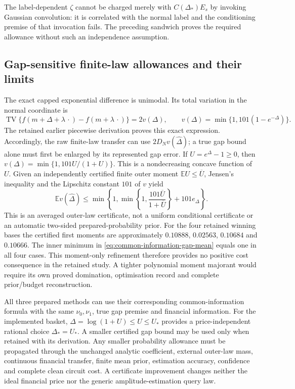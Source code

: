 The label-dependent $\zeta$ cannot be charged merely with
$C(\Delta_*)E_s$ by invoking Gaussian convolution: it is correlated with
the normal label and the conditioning premise of that invocation fails.
The preceding sandwich proves the required allowance without such an
independence assumption.

\subsection{Gap-sensitive finite-law allowances and their limits}

The exact capped exponential difference is unimodal. Its total variation
in the normal coordinate is
\begin{equation}
 \operatorname{TV}\{f(m+\Delta+\lambda\,\cdot)-f(m+\lambda\,\cdot)\}
 =2v(\Delta),\qquad
 v(\Delta)=\min\{1,101(1-e^{-\Delta})\}.
 \label{eq:common-information-gap-variation}
\end{equation}
The retained earlier piecewise derivation proves this exact expression.
Accordingly, the raw finite-law transfer can use
$2D_Nv(\widehat\Delta)$; a true gap bound alone must first be enlarged
by its represented gap error. If $U=e^\Delta-1\geq0$, then
$v(\Delta)=\min\{1,101U/(1+U)\}$. This is a nondecreasing concave
function of $U$. Given an independently certified finite outer moment
$\mathbb E U\leq\overline U$, Jensen's inequality and the Lipschitz
constant $101$ of $v$ yield
\begin{equation}
 \mathbb E v(\widehat\Delta)
 \leq\min\left\{1,
       \min\left\{1,\frac{101\overline U}{1+\overline U}\right\}
                   +101e_\Delta\right\}.
 \label{eq:common-information-gap-mean}
\end{equation}
This is an averaged outer-law certificate, not a uniform conditional
certificate or an automatic two-sided prepared-probability prior.
For the four retained winning bases the certified first moments are
approximately $0.10888$, $0.02563$, $0.10684$ and $0.10666$.
The inner minimum in \eqref{eq:common-information-gap-mean} equals one
in all four cases. This moment-only refinement therefore provides no
positive cost consequence in the retained study. A tighter polynomial
moment majorant would require its own proved domination, optimisation
record and complete prior/budget reconstruction.

All three prepared methods can use their corresponding common-information
formula with the same $\nu_0,\nu_1$, true gap premise and financial
information. For the implemented basket, $\Delta=\log(1+U)\leq U\leq U_*$
provides a price-independent rational choice $\Delta_*=U_*$. A smaller
certified gap bound may be used only when retained with its derivation.
Any smaller probability allowance must be propagated through the
unchanged analytic coefficient, external outer-law mass, continuous
financial transfer, finite mean prior, estimation accuracy, confidence
and complete clean circuit cost. A certificate improvement changes
neither the ideal financial price nor the generic amplitude-estimation
query law.
